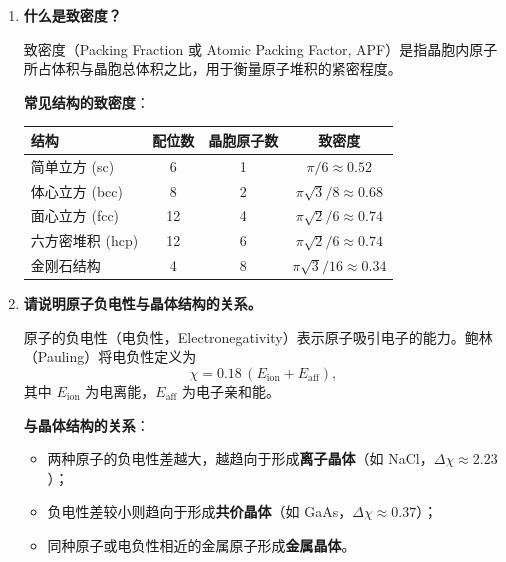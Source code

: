\begin{enumerate}[label=\textbf{\arabic*.}, leftmargin=2em, itemsep=0.8em]
倒格子基矢的显式表达式为
\[
    \mathbf{b}_1 = \frac{2\pi(\mathbf{a}_2\times\mathbf{a}_3)}{\mathbf{a}_1\cdot(\mathbf{a}_2\times\mathbf{a}_3)},\quad
    \mathbf{b}_2 = \frac{2\pi(\mathbf{a}_3\times\mathbf{a}_1)}{\mathbf{a}_1\cdot(\mathbf{a}_2\times\mathbf{a}_3)},\quad
    \mathbf{b}_3 = \frac{2\pi(\mathbf{a}_1\times\mathbf{a}_2)}{\mathbf{a}_1\cdot(\mathbf{a}_2\times\mathbf{a}_3)}.
\]

\item \textbf{什么是致密度？}

致密度（Packing Fraction 或 Atomic Packing Factor, APF）是指晶胞内原子所占体积与晶胞总体积之比，用于衡量原子堆积的紧密程度。

\textbf{常见结构的致密度}：
\begin{center}
\renewcommand{\arraystretch}{1.4}
\begin{tabular}{|l|c|c|c|}
\hline
\textbf{结构} & \textbf{配位数} & \textbf{晶胞原子数} & \textbf{致密度} \\
\hline
简单立方 (sc) & 6 & 1 & $\pi/6 \approx 0.52$ \\
体心立方 (bcc) & 8 & 2 & $\pi\sqrt{3}/8 \approx 0.68$ \\
面心立方 (fcc) & 12 & 4 & $\pi\sqrt{2}/6 \approx 0.74$ \\
六方密堆积 (hcp) & 12 & 6 & $\pi\sqrt{2}/6 \approx 0.74$ \\
金刚石结构 & 4 & 8 & $\pi\sqrt{3}/16 \approx 0.34$ \\
\hline
\end{tabular}
\end{center}

\item \textbf{请说明原子负电性与晶体结构的关系。}

原子的负电性（电负性，Electronegativity）表示原子吸引电子的能力。鲍林（Pauling）将电负性定义为
\[
    \chi = 0.18\,(E_{\text{ion}} + E_{\text{aff}}),
\]
其中 $E_{\text{ion}}$ 为电离能，$E_{\text{aff}}$ 为电子亲和能。

\textbf{与晶体结构的关系}：
\begin{itemize}[nosep]
    \item 两种原子的负电性差越大，越趋向于形成\textbf{离子晶体}（如 NaCl，$\Delta\chi \approx 2.23$）；
    \item 负电性差较小则趋向于形成\textbf{共价晶体}（如 GaAs，$\Delta\chi \approx 0.37$）；
    \item 同种原子或电负性相近的金属原子形成\textbf{金属晶体}。
\end{itemize}


\end{enumerate}
